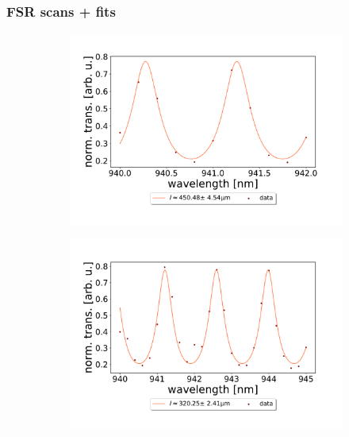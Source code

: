 \subsubsection*{FSR scans + fits}

\begin{figure}[h!]
    \centering
    \begin{subfigure}[b]{0.49\textwidth}
        \includegraphics[width=\textwidth]{figures/results/double fano fits/20250326/453um_M3:M5_FSR_scan.pdf}
        \caption{}
        \label{fig:453um_M3:M5_FSR_scan}
    \end{subfigure}
    \begin{subfigure}[b]{0.49\textwidth}
        \includegraphics[width=\textwidth]{figures/results/double fano fits/20250326/323um_M3:M5_FSR_scan.pdf}
        \caption{}
        \label{fig:323um_M3:M5_FSR_scan}

\end{subfigure}
\end{figure}
